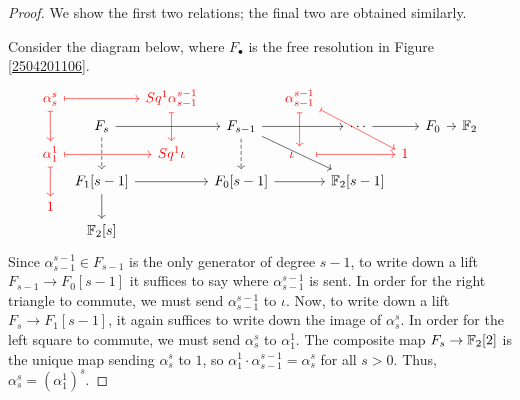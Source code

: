 \documentclass[11pt, titlepage]{article} %
\def\bb{\ensuremath\mathbb}
\def\textcolour{\textcolor}
\numberwithin{equation}{subsection}
\theoremstyle{plain}
\theoremstyle{definition}
\begin{document}
\begin{proof}
We show the first two relations; the final two are obtained similarly. %

Consider the diagram below, where \(F_\bullet\) is the free resolution in Figure \ref{2504201106}.
\[\begin{tikzcd}[row sep = 0.5ex, column sep=0.8ex]
\textcolour{red}{\alpha^s_s} \arrow[rr, "", mapsto, red] \arrow[dd, swap, "", red, mapsto]  & & \textcolour{red}{Sq^1\alpha^{s-1}_{s-1}}  \arrow[dd, ""', red, mapsto] & & \textcolour{red}{\alpha^{s-1}_{s-1}}  \arrow[dd, ""', red, mapsto] \arrow[rrdd, "", red, mapsto] & &&&& \\
& F_s \arrow[rr, swap, ""] \arrow[dd, ""', dashrightarrow] & & F_{s-1} \arrow[dd, ""', dashrightarrow] \arrow[rr, ""'] \arrow[rrdd] & & \cdots \arrow[rr] && F_0 \arrow[rr] && \bb{F}_2 \\
\textcolour{red}{\alpha^1_1} \arrow[rr, swap, "", red, mapsto] \arrow[dd, ""', red, mapsto] & & \textcolour{red}{Sq^1\iota} & & \textcolour{red}{\iota}\;\;\;\; \arrow[rr, ""', red, mapsto] & & \textcolour{red}{1} & & & \\
& F_1[s-1] \arrow[rr, swap, ""] \arrow[dd, ""'] & & F_0[s-1] \arrow[rr, ""'] & & \bb{F}_2[s-1] & & & &\\
\textcolour{red}{1} & &&&&&&&&\\
& \bb{F}_2[s] &&&&&&&&
\end{tikzcd}\]
Since \(\alpha^{s-1}_{s-1}\in F_{s-1}\) is the only generator of degree \(s-1\), to write down a lift \(F_{s-1}\to F_0[s-1]\) it suffices to say where \(\alpha^{s-1}_{s-1}\) is sent. In order for the right triangle to commute, we must send \(\alpha^{s-1}_{s-1}\) to \(\iota\). Now, to write down a lift \(F_s \to F_1[s-1]\), it again suffices to write down the image of \(\alpha^s_s\). In order for the left square to commute, we must send \(\alpha^s_s\) to \(\alpha^1_1\). The composite map \(F_s \to \bb{F}_2[2]\) is the unique map sending \(\alpha^s_s\) to \(1\), so \(\alpha^1_1\cdot \alpha^{s-1}_{s-1}=\alpha^s_s\) for all \(s>0\). Thus, \(\alpha^s_s=(\alpha^1_1)^s\). 


\end{proof}
\end{document}
